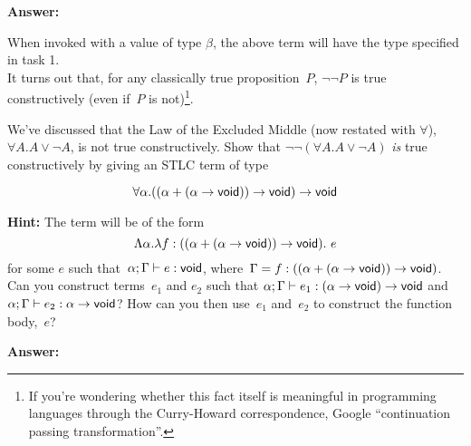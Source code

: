 \documentclass{article}
\begin{document}
\textbf{Answer:}
                    
When invoked with a value of type $\beta$, the above term will have the type specified in task 1.\\

It turns out that, for any classically true proposition~$P$, $\lnot \lnot P$
is true constructively (even if~$P$ is not)\footnote{If you're wondering
  whether this fact itself is meaningful in programming languages through
  the Curry-Howard correspondence, Google ``continuation passing transformation''.}.

\begin{task}
  We've discussed that the Law of the Excluded Middle (now restated with
  $\forall$),
  $\forall A. A \lor \lnot A$, is
  not true constructively. Show that
  $\lnot \lnot (\forall A. A \lor \lnot A)$ \textit{is} true constructively by
  giving an STLC term of type
  
  \[\forall \alpha. ((\alpha + (\alpha \rightarrow \mathsf{void})) \rightarrow \mathsf{void}) \rightarrow \mathsf{void}\]

  \textbf{Hint: }
    The term will be of the form
    \[\Lambda \alpha. \lambda f : ((\alpha + (\alpha \rightarrow \mathsf{void})) \rightarrow \mathsf{void}). ~e\]
    for some $e$ such that~$\alpha; \Gamma \vdash e : \mathsf{void}$,
    where~$\Gamma = f:((\alpha + (\alpha \rightarrow \mathsf{void})) \rightarrow \mathsf{void})$.
    Can you construct terms~$e_1$ and $e_2$ such that
    $\alpha; \Gamma \vdash e_1 : (\alpha \rightarrow \mathsf{void}) \rightarrow \mathsf{void}$
    and~$\alpha; \Gamma \vdash e_2 : \alpha \rightarrow \mathsf{void}$?
    How can you then use~$e_1$ and~$e_2$ to construct the function body,~$e$?
\end{task}

\textbf{Answer:}
\end{document}
